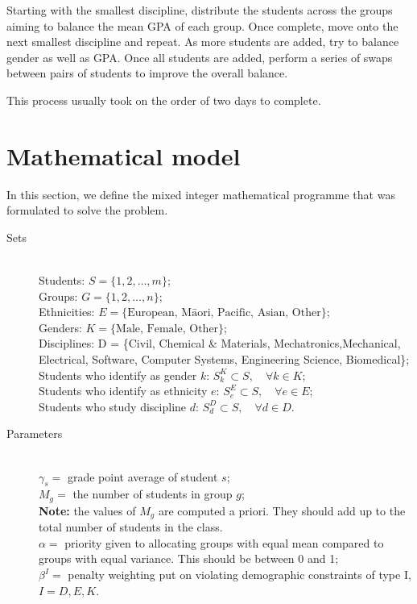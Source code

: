 \documentclass[12pt]{ORSNZ}
\begin{document}
Starting with the smallest discipline, distribute the students across the groups aiming to balance the mean GPA of each group. Once complete, move onto the next smallest discipline and repeat. As more students are added, try to balance gender as well as GPA. Once all students are added, perform a series of swaps between pairs of students to improve the overall balance.

This process usually took on the order of two days to complete.

\section{Mathematical model}
In this section, we define the mixed integer mathematical programme that was formulated to solve the problem.
\begin{description}
\item[Sets] \mbox{}\\
        Students: $S = \{1, 2, \dots, m\}$;\\
        Groups: $G = \{1, 2, \dots, n\}$;\\
        Ethnicities: $E = \{\mbox{European, M\=aori, Pacific, Asian, Other}\}$;\\
        Genders: $K = \{\mbox{Male, Female, Other}\}$;\\
        Disciplines: D = \{Civil, Chemical \& Materials, Mechatronics,Mechanical, Electrical, Software, Computer Systems, Engineering Science, Biomedical\};
        Students who identify as gender $k$: $S^K_k \subset S, \quad \forall k \in K$;\\
        Students who identify as ethnicity $e$: $S^E_e \subset S, \quad \forall e \in E$;\\
        Students who study discipline $d$: $S^D_d \subset S, \quad \forall d \in D$.



\item[Parameters] \mbox{} \\
$\gamma_s = $ grade point average of student $s$; \\
$M_g = $ the number of students in group $g$;\\
\textbf{Note:} the values of $M_g$ are computed a priori. They should add up to the total number of students in the class.\\
$\alpha = $ priority given to allocating groups with equal mean compared to groups with equal variance. This should be between 0 and 1;\\
$\beta^I = $ penalty weighting put on violating demographic constraints of type I, $I= D, E, K$.


\end{description}
\end{document}
